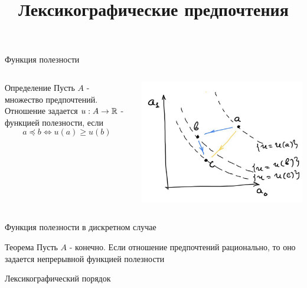 \documentclass{beamer}
\begin{document}
\begin{frame}{Функция полезности}

\begin{columns}
    \begin{block}{Определение}
Пусть $A$ - множество предпочтений. Отношение задается 
$u: A \to \mathbb{R}$ - функцией полезности, если
$$
a \preceq b \Leftrightarrow u(a) \geq u(b)
$$
\end{block}

\includegraphics[width=1\textwidth]{2_figs/utility_ordering.jpg}
\end{columns}
    
\end{frame}

\begin{frame}{Функция полезности в дискретном случае}
    \begin{block}{Теорема}
Пусть $A$ - конечно. Если отношение предпочтений рационально, то оно задается непрерывной функцией полезности
\end{block}
\end{frame}

\begin{frame}{Лексикографический порядок}

\end{frame}


\title{Лексикографические предпочтения}
\date{}
\end{document}
